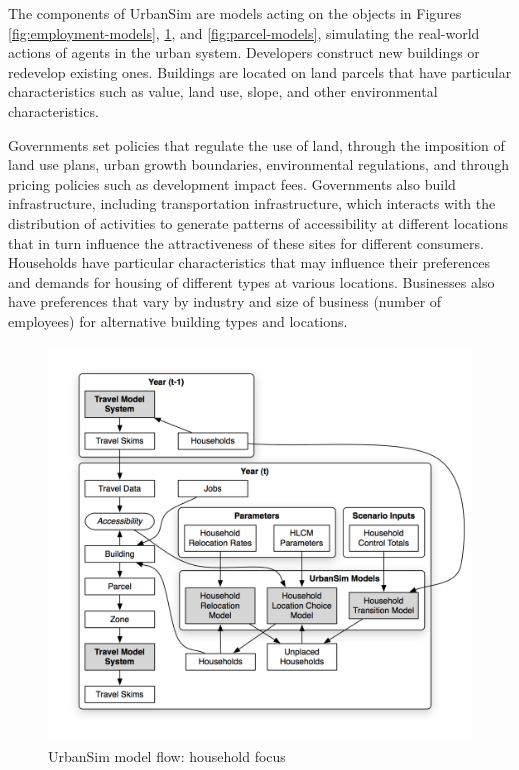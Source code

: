 The components of UrbanSim are models acting on the objects in Figures \ref{fig:employment-models}, \ref{fig:household-models}, and \ref{fig:parcel-models}, simulating the real-world actions of agents in the urban system. Developers construct new buildings or redevelop existing ones. Buildings are located on land parcels that have particular characteristics such as value, land use, slope, and other environmental characteristics.

Governments set policies that regulate the use of land, through the imposition of land use plans, urban growth boundaries, environmental regulations, and through pricing policies such as development impact fees. Governments also build infrastructure, including transportation infrastructure, which interacts with the distribution of activities to generate patterns of accessibility at different locations that in turn influence the attractiveness of these sites for different consumers. Households have particular characteristics that may influence their preferences and demands for housing of different types at various locations. Businesses also have preferences that vary by industry and size of business (number of employees) for alternative building types and locations.

\begin{figure}[ht]
    \center
    \includegraphics[width=\textwidth]{graphics/ParcelHouseholdModel.png}
    \caption{UrbanSim model flow: household focus}
    \label{fig:household-models}
\end{figure}

